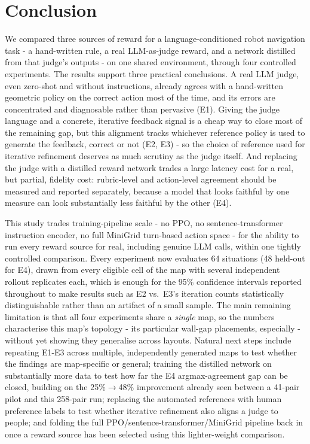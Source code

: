 \documentclass[conference]{IEEEtran}
\begin{document}
\section{Conclusion}
\label{sec:conclusion}

We compared three sources of reward for a language-conditioned robot
navigation task - a hand-written rule, a real LLM-as-judge reward, and
a network distilled from that judge's outputs - on one shared
environment, through four controlled experiments. The results support
three practical conclusions. A real LLM judge, even zero-shot and
without instructions, already agrees with a hand-written geometric
policy on the correct action most of the time, and its errors are
concentrated and diagnosable rather than pervasive (E1). Giving the
judge language and a concrete, iterative feedback signal is a cheap way
to close most of the remaining gap, but this alignment tracks whichever
reference policy is used to generate the feedback, correct or not (E2,
E3) - so the choice of reference used for iterative refinement deserves
as much scrutiny as the judge itself. And replacing the judge with a
distilled reward network trades a large latency cost for a real, but
partial, fidelity cost: rubric-level and action-level agreement should
be measured and reported separately, because a model that looks faithful
by one measure can look substantially less faithful by the other (E4).

This study trades training-pipeline scale - no PPO, no
sentence-transformer instruction encoder, no full MiniGrid turn-based
action space - for the ability to run every reward source for real,
including genuine LLM calls, within one tightly controlled comparison.
Every experiment now evaluates 64 situations (48 held-out for E4),
drawn from every eligible cell of the map with several independent
rollout replicates each, which is enough for the 95\% confidence
intervals reported throughout to make results such as E2 vs.\ E3's
iteration counts statistically distinguishable rather than an artifact
of a small sample. The main remaining limitation is that all four
experiments share a \emph{single} map, so the numbers characterise this
map's topology - its particular wall-gap placements, especially -
without yet showing they generalise across layouts. Natural next steps
include repeating E1-E3 across multiple, independently generated maps
to test whether the findings are map-specific or general; training the
distilled network on substantially more data to test how far the E4
argmax-agreement gap can be closed, building on the 25\%$\to$48\%
improvement already seen between a 41-pair pilot and this 258-pair run;
replacing the automated references with human preference labels to test
whether iterative refinement also aligns a judge to people; and folding
the full PPO/sentence-transformer/MiniGrid pipeline back in once a
reward source has been selected using this lighter-weight comparison.



\end{document}

